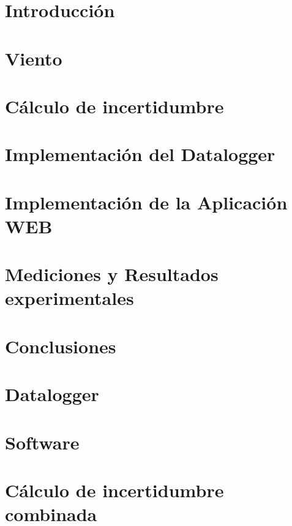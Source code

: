 \documentclass[11pt, a4paper,oneside]{book}
\begin{document}

\clearpage\hbox{}\thispagestyle{empty}\newpage

\clearpage\hbox{}\thispagestyle{empty}\newpage

\clearpage\hbox{}\thispagestyle{empty}\newpage

\clearpage\hbox{}\thispagestyle{empty}\newpage
\tableofcontents
\listoffigures
\listoftables
\newpage

\setcounter{page}{1}

\chapter{Introducción}\label{cap:introduccion}


\chapter{Viento}\label{cap:viento}

\chapter{Cálculo de incertidumbre}\label{cap:incertidumbre}

\chapter{Implementación del Datalogger}\label{cap:datalogger}

\chapter{Implementación de la Aplicación WEB}\label{cap:aplicacionweb}

\chapter{Mediciones y Resultados experimentales}\label{cap:med_result}



\chapter{Conclusiones}



\appendix
\chapter{Datalogger}

\chapter{Software}

\chapter{Cálculo de incertidumbre combinada}

\printbibliography



\end{document}
